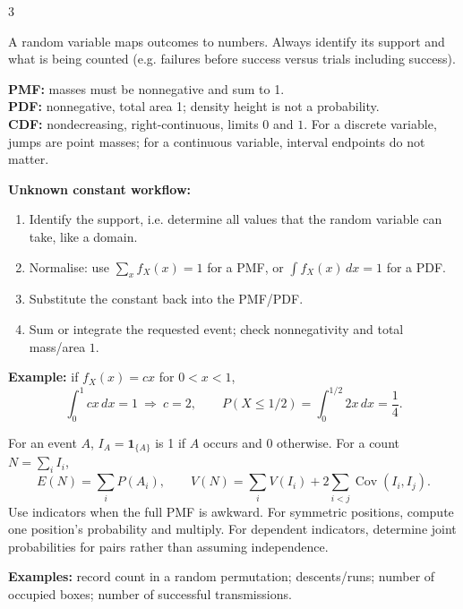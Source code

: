 \documentclass[10pt]{article}
\newcommand{\ind}[1]{\mathbf 1_{\{#1\}}}
\newcommand{\boxstart}[1]{\begin{tcolorbox}[title={#1},sharp corners]}
\newcommand{\boxend}{\end{tcolorbox}}
\begin{document}
\begin{multicols*}{3}
	\boxstart{L3 — Random-variable interpretation}
	A random variable maps outcomes to numbers. Always identify its support and what is being counted (e.g. failures before success versus trials including success).

	\textbf{PMF:} masses must be nonnegative and sum to 1. \quad\\
	\textbf{PDF:} nonnegative, total area 1; density height is not a probability.\\
	\textbf{CDF:} nondecreasing, right-continuous, limits $0$ and $1$. For a discrete variable, jumps are point masses; for a continuous variable, interval endpoints do not matter.

	\textbf{Unknown constant workflow:}
	\begin{enumerate}[label=\arabic*.,leftmargin=*,itemsep=0pt]
		\item Identify the support, i.e. determine all values that the random variable can take, like a domain.
		\item Normalise: use $\sum_x f_X(x)=1$ for a PMF, or $\int f_X(x)\,dx=1$ for a PDF.
		\item Substitute the constant back into the PMF/PDF.
		\item Sum or integrate the requested event; check nonnegativity and total mass/area $1$.
	\end{enumerate}
	\textbf{Example:} if $f_X(x)=cx$ for $0<x<1$,
	\[
		\int_0^1cx\,dx=1\ \Rightarrow\ c=2,
		\qquad P(X\le1/2)=\int_0^{1/2}2x\,dx=\frac14.
	\]
	\boxend

	\boxstart{L3 — Indicators and symmetry}
	For an event $A$, $I_A=\ind{A}$ is 1 if $A$ occurs and 0 otherwise. For a count $N=\sum_i I_i$,
	\[
		E(N)=\sum_iP(A_i),\qquad
		V(N)=\sum_iV(I_i)+2\sum_{i<j}\operatorname{Cov}(I_i,I_j).
	\]
	Use indicators when the full PMF is awkward. For symmetric positions, compute one position’s probability and multiply. For dependent indicators, determine joint probabilities for pairs rather than assuming independence.

	\textbf{Examples:} record count in a random permutation; descents/runs; number of occupied boxes; number of successful transmissions.
	\boxend


\end{multicols*}
\end{document}
